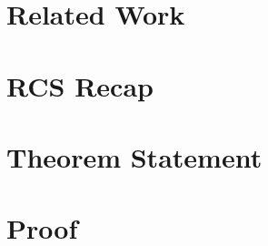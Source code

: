 \documentclass[conference]{IEEEtran}
\newcommand{\composite}{\stab^{\mathrm{comp}}}
\begin{document}
\section{Related Work}
\label{sec:related}

\section{RCS Recap}
\label{sec:recap}

\section{Theorem Statement}
\label{sec:theorem}

\section{Proof}
\label{sec:proof}
\end{document}
